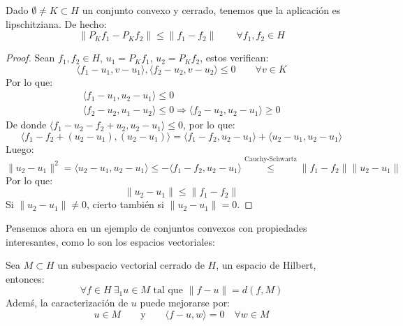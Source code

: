 \begin{prop}
    Dado $\emptyset  \neq K\subset H$ un conjunto convexo y cerrado, tenemos que la aplicación
    es lipschitziana. De hecho:
    \begin{equation*}
        \|P_Kf_1 - P_Kf_2\| \leq \|f_1 - f_2\| \qquad \forall f_1,f_2\in H
    \end{equation*}
    \begin{proof}
        Sean $f_1, f_2\in H$, $u_1 = P_Kf_1$, $u_2=P_Kf_2$, estos verifican:
        \begin{equation*}
            \langle f_1-u_1, v-u_1 \rangle , \langle f_2-u_2,v-u_2 \rangle  \leq 0 \qquad \forall v\in K
        \end{equation*}
        Por lo que:
        \begin{gather*}
            \langle f_1 - u_1, u_2 - u_1 \rangle  \leq 0 \\
            \langle f_2 - u_2, u_1 - u_2 \rangle \leq 0 \Longrightarrow \langle f_2 - u_2, u_2 - u_1 \rangle \geq 0
        \end{gather*}
        De donde $\langle f_1 - u_2 - f_2 + u_2, u_2 - u_1 \rangle \leq 0$, por lo que:
        \begin{equation*}
            \langle f_1 - f_2 + (u_2 - u_1), (u_2 - u_1) \rangle  = \langle f_1 - f_2, u_2 - u_1 \rangle  + \langle u_2 - u_1, u_2 - u_1 \rangle 
        \end{equation*}
        Luego:
        \begin{equation*}
            \|u_2 - u_1\|^2 = \langle u_2 - u_1, u_2 - u_1 \rangle  \leq - \langle f_1 - f_2, u_2 - u_1 \rangle \stackrel{\text{Cauchy-Schwartz}}{\leq} \|f_1 - f_2\| \|u_2 - u_1\|
        \end{equation*}
        Por lo que:
        \begin{equation*}
            \|u_2 - u_1\| \leq \|f_1 - f_2\|
        \end{equation*}
        Si $\|u_2 - u_1\| \neq 0$, cierto también si $\|u_2 - u_1\| = 0$.
    \end{proof}
\end{prop}

\noindent
Pensemos ahora en un ejemplo de conjuntos convexos con propiedades interesantes, como lo son los espacios vectoriales:

\begin{coro}
    Sea $M\subset H$ un subespacio vectorial cerrado de $H$, un espacio de Hilbert, entonces:
    \begin{equation*}
        \forall f\in H~\exists _1 u \in M \text{\ tal que\ } \|f-u\| = d(f,M)
    \end{equation*}
    Ademś, la caracterización de $u$ puede mejorarse por:
    \begin{equation*}
        u\in M \qquad \text{y} \qquad \langle f-u,w \rangle  = 0 \quad \forall w\in M
    \end{equation*}
\end{coro}

